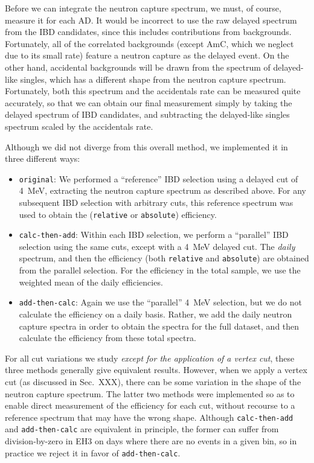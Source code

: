 \documentclass[../thesis.tex]{subfiles}
\begin{document}
Before we can integrate the neutron capture spectrum, we must, of course, measure it for each AD. It would be incorrect to use the raw delayed spectrum from the IBD candidates, since this includes contributions from backgrounds. Fortunately, all of the correlated backgrounds (except AmC, which we neglect due to its small rate) feature a neutron capture as the delayed event. On the other hand, accidental backgrounds will be drawn from the spectrum of delayed-like singles, which has a different shape from the neutron capture spectrum. Fortunately, both this spectrum and the accidentals rate can be measured quite accurately, so that we can obtain our final measurement simply by taking the delayed spectrum of IBD candidates, and subtracting the delayed-like singles spectrum scaled by the accidentals rate.

Although we did not diverge from this overall method, we implemented it in three different ways:

\begin{itemize}
\item \texttt{original}: We performed a ``reference'' IBD selection using a delayed cut of 4~MeV, extracting the neutron capture spectrum as described above. For any subsequent IBD selection with arbitrary cuts, this reference spectrum was used to obtain the (\texttt{relative} or \texttt{absolute}) efficiency.
\item \texttt{calc-then-add}: Within each IBD selection, we perform a ``parallel'' IBD selection using the same cuts, except with a 4~MeV delayed cut. The \emph{daily} spectrum, and then the efficiency (both \texttt{relative} and \texttt{absolute}) are obtained from the parallel selection. For the efficiency in the total sample, we use the weighted mean of the daily efficiencies.
\item \texttt{add-then-calc}: Again we use the ``parallel'' 4~MeV selection, but we do not calculate the efficiency on a daily basis. Rather, we add the daily neutron capture spectra in order to obtain the spectra for the full dataset, and then calculate the efficiency from these total spectra.
\end{itemize}

For all cut variations we study \emph{except for the application of a vertex cut}, these three methods generally give equivalent results. However, when we apply a vertex cut (as discussed in Sec.~XXX), there can be some variation in the shape of the neutron capture spectrum. The latter two methods were implemented so as to enable direct measurement of the efficiency for each cut, without recourse to a reference spectrum that may have the wrong shape. Although \texttt{calc-then-add} and \texttt{add-then-calc} are equivalent in principle, the former can suffer from division-by-zero in EH3 on days where there are no events in a given bin, so in practice we reject it in favor of \texttt{add-then-calc}.
\end{document}

